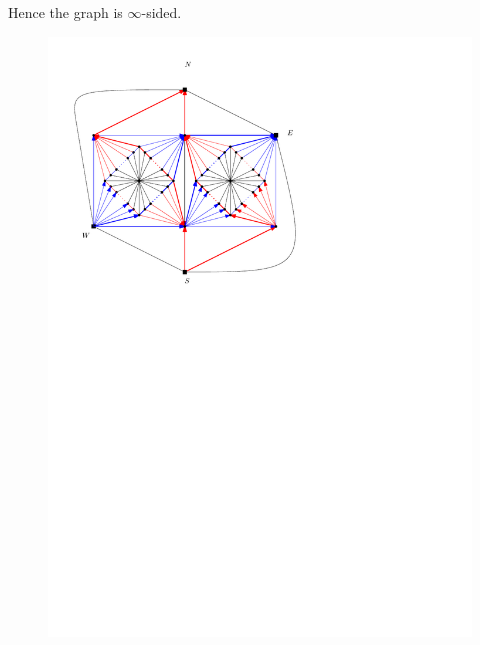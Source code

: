   Hence the graph is $\infty$-sided.

  \begin{figure}[h]
    \centering
    \includegraphics[scale=1]{fixExtension/img/manymany4}
    \caption{}
    \label{fig:fix:manymany4}
  \end{figure}
